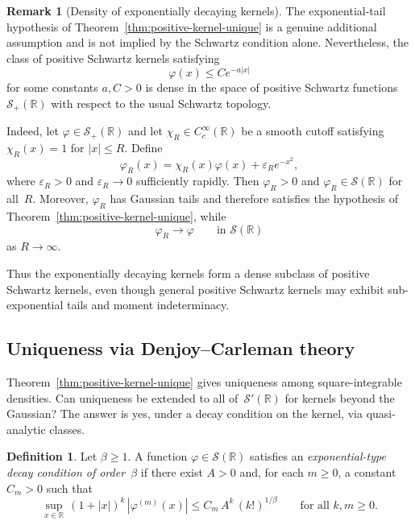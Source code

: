 \documentclass[12pt]{article}
\theoremstyle{definition}
\newtheorem{definition}[theorem]{Definition}
\newtheorem{remark}[theorem]{Remark}
\newcommand{\R}{\mathbb{R}}
\begin{document}
\begin{remark}[Density of exponentially decaying kernels]
\label{rem:dense-exp-kernels}
The exponential-tail hypothesis of Theorem~\ref{thm:positive-kernel-unique} is a genuine additional
assumption and is not implied by the Schwartz condition alone.
Nevertheless, the class of positive Schwartz kernels satisfying
\[
   \varphi(x)\le C e^{-a|x|}
\]
for some constants $a,C>0$ is dense in the space of positive Schwartz
functions $\mathcal S_+(\mathbb R)$ with respect to the usual Schwartz
topology.

Indeed, let $\varphi\in\mathcal S_+(\mathbb R)$ and let
$\chi_R\in C_c^\infty(\mathbb R)$ be a smooth cutoff satisfying
$\chi_R(x)=1$ for $|x|\le R$.  Define
\[
   \varphi_R(x)
   =
   \chi_R(x)\varphi(x)
   + \varepsilon_R e^{-x^2},
\]
where $\varepsilon_R>0$ and $\varepsilon_R\to0$ sufficiently rapidly.
Then $\varphi_R>0$ and $\varphi_R\in\mathcal S(\mathbb R)$ for all~$R$.
Moreover, $\varphi_R$ has Gaussian tails and therefore satisfies the
hypothesis of Theorem~\ref{thm:positive-kernel-unique}, while
\[
   \varphi_R \longrightarrow \varphi
   \qquad\text{in }\mathcal S(\mathbb R)
\]
as $R\to\infty$.

Thus the exponentially decaying kernels form a dense subclass of
positive Schwartz kernels, even though general positive Schwartz kernels
may exhibit sub-exponential tails and moment indeterminacy.
\end{remark}

\subsection{Uniqueness via Denjoy--Carleman theory}
\label{subsec:dc-unique}

Theorem~\ref{thm:positive-kernel-unique} gives uniqueness among square-integrable densities.  Can uniqueness be extended to all of~$\mathcal{S}'(\R)$ for kernels beyond the Gaussian?  The answer is yes, under a decay condition on the kernel, via quasi-analytic classes.

\begin{definition}\label{def:exp-type-decay}
Let $\beta \geq 1$.  A function $\varphi \in \mathcal{S}(\R)$ satisfies an \emph{exponential-type decay condition of order~$\beta$} if there exist $A > 0$ and, for each $m \geq 0$, a constant $C_m > 0$ such that
\begin{equation}\label{eq:gevrey-decay}
  \sup_{x \in \R}\,
  (1 + |x|)^k \,|\varphi^{(m)}(x)|
  \leq C_m \, A^k \, (k!)^{1/\beta}
  \qquad \text{for all } k, m \geq 0.
\end{equation}
\end{definition}
\end{document}
